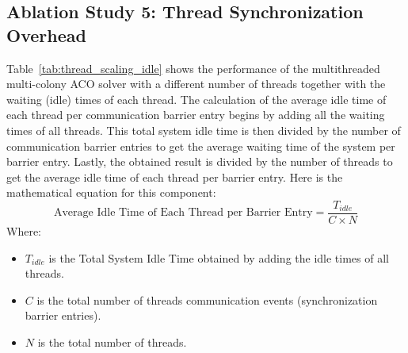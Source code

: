 \subsection{Ablation Study 5: Thread Synchronization Overhead}
Table~\ref{tab:thread_scaling_idle} shows the performance of the multithreaded multi-colony ACO solver with a different number of threads together with the waiting (idle) times of each thread. The calculation of the  average idle time of each thread per communication barrier entry begins by adding all the waiting times of all threads. This total system idle time is then divided by the number of communication barrier entries to get the average waiting time of the system per barrier entry. Lastly, the obtained result is divided by the number of threads to get the average idle time of each thread per barrier entry. Here is the mathematical equation for this component: 
\begin{equation}
    \text{Average Idle Time of Each Thread per Barrier Entry} = \frac{T_{idle}}{C \times N}
    \label{eq:avg_idle_time}
\end{equation}
Where:
\begin{itemize}
    \item \textbf{$T_{idle}$} is the Total System Idle Time obtained by adding the idle times of all threads.
    \item \textbf{$C$} is the total number of threads communication events (synchronization barrier entries). 
    \item \textbf{$N$} is the total number of threads.
\end{itemize}

\begin{table}[H]
    \centering
    \caption{Performance comparison in terms of success rate (\%), average runtime (seconds), average iteration, and average idle time of each thread per barrier entry (seconds/entry) of varying number of threads in MT-CP-DCM-ACO solver on $25\times25$ Sudoku instance}
    \label{tab:thread_scaling_idle}
\end{table}

